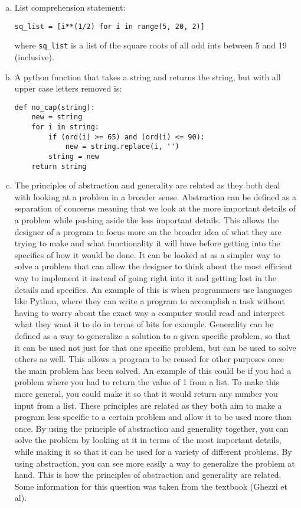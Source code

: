 \documentclass[12pt]{article}
\begin{document}
\begin{enumerate}[a)]
\item List comprehension statement:

\begin{verbatim}
sq_list = [i**(1/2) for i in range(5, 20, 2)]
\end{verbatim}

where \verb|sq_list| is a list of the square roots of all odd ints between 5 and 19 (inclusive).

\item A python function that takes a string and returns the string, but with all upper case 
letters removed is:

\begin{verbatim}
def no_cap(string):
    new = string
    for i in string:
        if (ord(i) >= 65) and (ord(i) <= 90):
            new = string.replace(i, '')
        string = new
    return string
\end{verbatim}

\item The principles of abstraction and generality are related as they both deal with looking at 
a problem in a broader sense. Abstraction can be defined as a separation of concerns meaning that 
we look at the more important details of a problem while pushing aside the less important 
details. This allows the designer of a program to focus more on the broader idea of what they are 
trying to make and what functionality it will have before getting into the specifics of how it 
would be done. It can be looked at as a simpler way to solve a problem that can allow the 
designer to think about the most efficient way to implement it instead of going right into it and 
getting lost in the details and specifics. An example of this is when programmers use languages 
like Python, where they can write a program to accomplish a task without having to worry about 
the exact way a computer would read and interpret what they want it to do in terms of bits for 
example. Generality can be defined as a way to generalize a solution to a given specific problem, 
so that it can be used not just for that one specific problem, but can be used to solve others as 
well. This allows a program to be reused for other purposes once the main problem has been 
solved. An example of this could be if you had a problem where you had to return the value of 1 
from a list. To make this more general, you could make it so that it would return any number you 
input from a list. These principles are related as they both aim to make a program less specific 
to a certain problem and allow it to be used more than once. By using the principle of 
abstraction and generality together, you can solve the problem by looking at it in terms of the 
most important details, while making it so that it can be used for a variety of different 
problems. By using abstraction, you can see more easily a way to generalize the problem at hand. 
This is how the principles of abstraction and generality are related. Some information for this 
question was taken from the textbook (Ghezzi et al). 


\end{enumerate}
\end{document}
